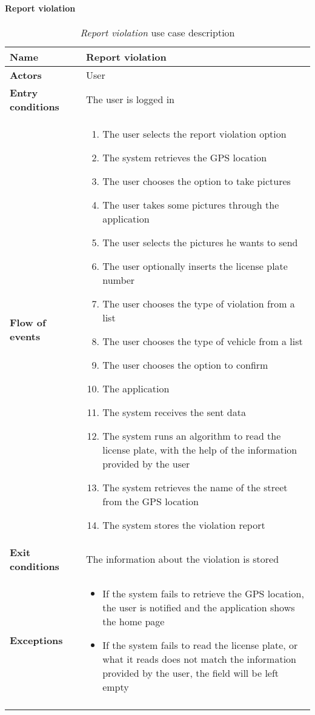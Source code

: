 		\paragraph{Report violation}
		\begin{longtable}{p{0.25\linewidth}p{0.75\linewidth}}
			\toprule
			\textbf{Name} & \textbf{Report violation} \\
			\midrule
			\textbf{Actors} & User \\
			\midrule
			\textbf{Entry conditions} & The user is logged in \\
			\midrule
			\textbf{Flow of events} & 
			\begin{enumerate}
				\item The user selects the report violation option
				\item The system retrieves the GPS location
				\item The user chooses the option to take pictures
				\item The user takes some pictures through the application
				\item The user selects the pictures he wants to send
				\item The user optionally inserts the license plate number
				\item The user chooses the type of violation from a list
				\item The user chooses the type of vehicle from a list
				\item The user chooses the option to confirm
				\item The application 
				\item The system receives the sent data
				\item The system runs an algorithm to read the license plate, with the help of the information provided by the user
				\item The system retrieves the name of the street from the GPS location
				\item The system stores the violation report
			\end{enumerate} \\
			\midrule
			\textbf{Exit conditions} & The information about the violation is stored\\
			\midrule
			\textbf{Exceptions} & 
			\begin{itemize}
				\item If the system fails to retrieve the GPS location, the user is notified and the application shows the home page
				\item If the system fails to read the license plate, or what it reads does not match the information provided by the user, the field will be left empty
			\end{itemize} \\
			\bottomrule
			\caption{\emph{Report violation} use case description}
		\end{longtable}

